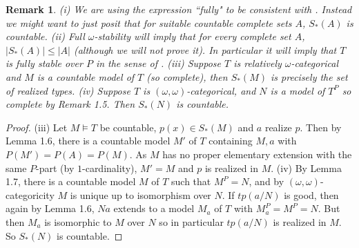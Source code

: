 \documentclass[12pt]{article}
\newtheorem{Remark}[Theorem]{Remark}
\begin{document}
\begin{Remark} (i)  We are using the expression ``fully" to be consistent with \cite{Usvyatsov}. Instead we might want to just posit that for suitable countable complete sets $A$, $S_{*}(A)$ is countable. 
\newline
(ii)  Full $\omega$-stability will imply that for every complete set $A$, $|S_{*}(A)| \leq |A|$ (although we will not prove it).  In particular it will imply that $T$ is fully stable over $P$ in the sense of \cite{Usvyatsov}. 
\newline
(iii)  Suppose $T$ is relatively $\omega$-categorical and $M$ is a countable model of $T$ (so complete), then $S_{*}(M)$ is precisely the set of realized types.
\newline
(iv) Suppose $T$ is  $(\omega, \omega)$-categorical, and $N$ is a model of $T^{P}$ so  complete by Remark 1.5.  Then $S_{*}(N)$ is countable. 
\end{Remark} 
\begin{proof}
(iii) Let $M\models T$ be countable,  $p(x)\in S_{*}(M)$ and $a$ realize $p$. Then  by Lemma 1.6, there is a countable  model $M'$ of $T$ containing $M,a$ with $P(M') = P(A) =  P(M)$.  As $M$ has no proper elementary extension with the same $P$-part (by $1$-cardinality), $M' = M$ and $p$ is realized in $M$.
\newline
(iv)  By Lemma 1.7, there is a countable model $M$ of $T$ such that $M^{P} = N$, and by $(\omega, \omega)$-categoricity $M$ is unique up to isomorphism over $N$.  If $tp(a/N)$ is good, then again by Lemma 1.6, $Na$ extends to a model $M_{a}$ of $T$ with $M_{a}^{P} = M^{P} = N$. But then $M_{a}$ is isomorphic to $M$ over $N$ so in particular $tp(a/N)$ is realized in $M$. So $S_{*}(N)$ is countable. 


\end{proof}
\end{document}
